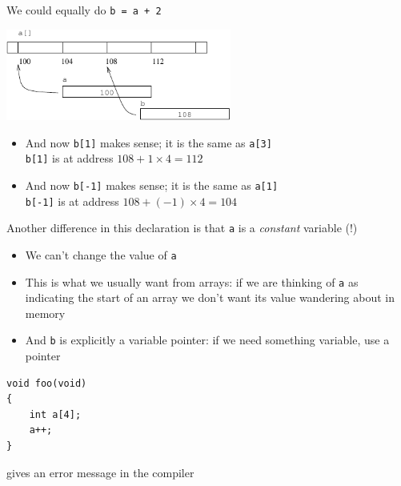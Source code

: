 \documentclass{beamer}
\def\code#1{{\ifmmode\else\large\fi\tt#1}}
\begin{document}
\begin{frame}
We could equally do \code{b = a + 2}
\bigskip 
\begin{center}
\includegraphics[height=3cm, keepaspectratio]{Pics/ptrarray5}
\end{center}
\begin{itemize}
\item{And now \code{b[1]} makes sense; it is the same as \code{a[3]}\\
\code{b[1]} is at address $108 + 1\times4 = 112$}

\item{And now \code{b[-1]} makes sense; it is the same as \code{a[1]}\\
\code{b[-1]} is at address $108 + (-1)\times4 = 104$}
\end{itemize}
\end{frame}

\begin{frame}
Another difference in this declaration is that \code{a} is a {\em constant\/}
variable (!)
\begin{itemize}
\item{We can't change the value of \code{a}}

\item{This is what we usually want from arrays: if we are thinking of
  \code{a} as indicating the start of an array we don't want its value
  wandering about in memory}

\item{And \code{b} is explicitly a variable pointer: if we need
  something variable, use a pointer}
\end{itemize}
\end{frame}

\begin{frame}[fragile]
\begin{block}{}
\begin{lstlisting}
void foo(void)
{
    int a[4];
    a++; 
}
\end{lstlisting}
\end{block}

gives an error message in the compiler

\end{frame}
\end{document}
